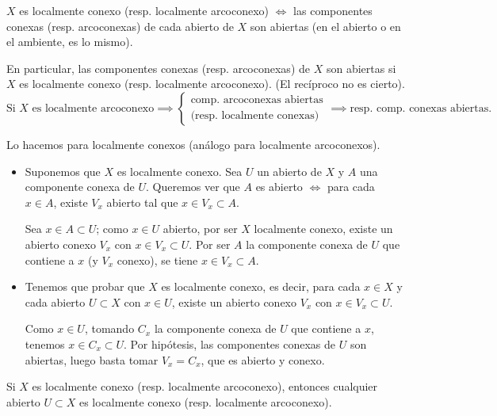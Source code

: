 \begin{teo}
$X$ es localmente conexo (resp. localmente arcoconexo) $\iff$ las componentes conexas (resp. arcoconexas) de cada abierto de $X$ son abiertas (en el abierto o en el ambiente, es lo mismo).

En particular, las componentes conexas (resp. arcoconexas) de $X$ son abiertas si $X$ es localmente conexo (resp. localmente arcoconexo). (El recíproco no es cierto).
\[
    \text{Si } X \text{ es localmente arcoconexo} \implies
    \begin{cases}
        \text{comp. arcoconexas abiertas} \\
        \text{(resp. localmente conexas)}
    \end{cases}
    \implies \text{resp. comp. conexas abiertas.}
\]
\end{teo}
\begin{dem}
Lo hacemos para localmente conexos (análogo para localmente arcoconexos).

\begin{itemize}
    \item[$(\Rightarrow)$] Suponemos que $X$ es localmente conexo. Sea $U$ un abierto de $X$ y $A$ una componente conexa de $U$. Queremos ver que $A$ es abierto $\iff$ para cada $x \in A$, existe $V_x$ abierto tal que $x \in V_x \subset A$.
    
    Sea $x \in A \subset U$; como $x \in U$ abierto, por ser $X$ localmente conexo, existe un abierto conexo $V_x$ con $x \in V_x \subset U$. Por ser $A$ la componente conexa de $U$ que contiene a $x$ (y $V_x$ conexo), se tiene $x \in V_x \subset A$.

    \item[$(\Leftarrow)$] Tenemos que probar que $X$ es localmente conexo, es decir, para cada $x \in X$ y cada abierto $U \subset X$ con $x \in U$, existe un abierto conexo $V_x$ con $x \in V_x \subset U$.
    
    Como $x \in U$, tomando $C_x$ la componente conexa de $U$ que contiene a $x$, tenemos $x \in C_x \subset U$. Por hipótesis, las componentes conexas de $U$ son abiertas, luego basta tomar $V_x = C_x$, que es abierto y conexo.
\end{itemize}
\end{dem}
\begin{prop}
Si $X$ es localmente conexo (resp. localmente arcoconexo), entonces cualquier abierto $U \subset X$ es localmente conexo (resp. localmente arcoconexo).
\end{prop}

